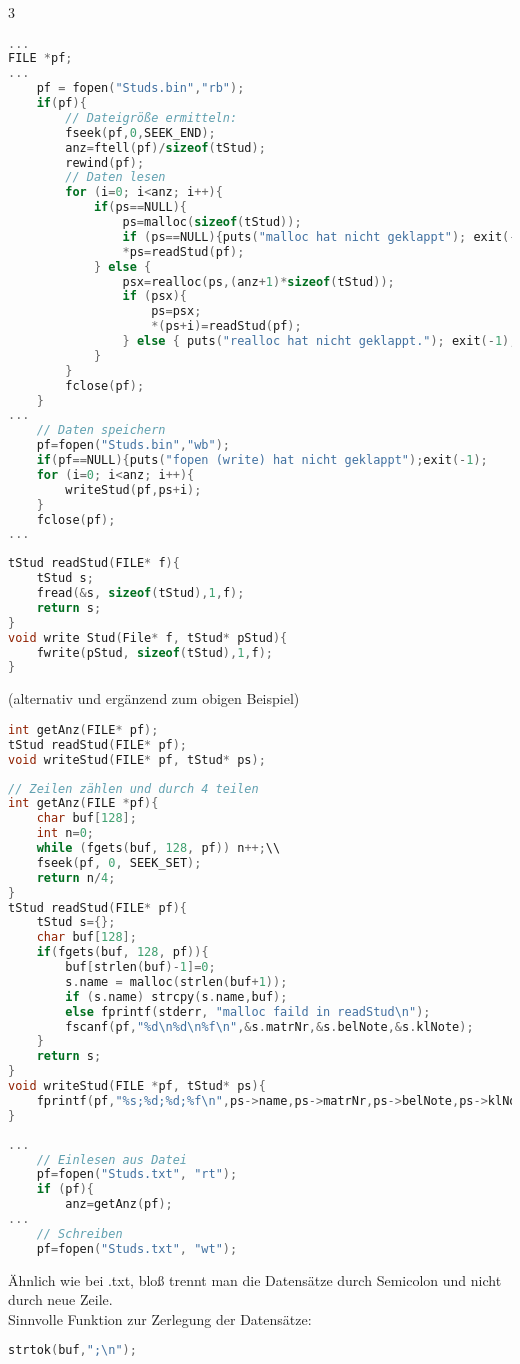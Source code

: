 \begin{multicols}{3}
\begin{lstlisting}[language=C]
...
FILE *pf;
...
	pf = fopen("Studs.bin","rb");
	if(pf){
		// Dateigröße ermitteln:
		fseek(pf,0,SEEK_END);
		anz=ftell(pf)/sizeof(tStud);
		rewind(pf);		
		// Daten lesen
		for (i=0; i<anz; i++){
			if(ps==NULL){
				ps=malloc(sizeof(tStud));
				if (ps==NULL){puts("malloc hat nicht geklappt"); exit(-1);}
				*ps=readStud(pf);
			} else {	
				psx=realloc(ps,(anz+1)*sizeof(tStud));
				if (psx){
					ps=psx;
					*(ps+i)=readStud(pf);
				} else { puts("realloc hat nicht geklappt."); exit(-1);}
			}
		}
		fclose(pf);
	}
...
	// Daten speichern
	pf=fopen("Studs.bin","wb");
	if(pf==NULL){puts("fopen (write) hat nicht geklappt");exit(-1);
	for (i=0; i<anz; i++){
		writeStud(pf,ps+i);
	}
	fclose(pf);
...
\end{lstlisting}
\begin{lstlisting}[language=C]
tStud readStud(FILE* f){
	tStud s;
	fread(&s, sizeof(tStud),1,f);
	return s;
}
void write Stud(File* f, tStud* pStud){
	fwrite(pStud, sizeof(tStud),1,f);
}
\end{lstlisting}
 (alternativ und ergänzend zum obigen Beispiel)
\begin{lstlisting}[language=C]
int getAnz(FILE* pf);
tStud readStud(FILE* pf);
void writeStud(FILE* pf, tStud* ps);
\end{lstlisting}
\begin{lstlisting}[language=C]
// Zeilen zählen und durch 4 teilen
int getAnz(FILE *pf){
	char buf[128];
	int n=0;
	while (fgets(buf, 128, pf)) n++;\\
	fseek(pf, 0, SEEK_SET);
	return n/4;
}
tStud readStud(FILE* pf){
	tStud s={};
	char buf[128];
	if(fgets(buf, 128, pf)){
		buf[strlen(buf)-1]=0;
		s.name = malloc(strlen(buf+1));
		if (s.name) strcpy(s.name,buf);
		else fprintf(stderr, "malloc faild in readStud\n");
		fscanf(pf,"%d\n%d\n%f\n",&s.matrNr,&s.belNote,&s.klNote);
	}
	return s;
}
void writeStud(FILE *pf, tStud* ps){
	fprintf(pf,"%s;%d;%d;%f\n",ps->name,ps->matrNr,ps->belNote,ps->klNote);  
}
\end{lstlisting}
\begin{lstlisting}[language=C]
...
	// Einlesen aus Datei
	pf=fopen("Studs.txt", "rt");
	if (pf){
		anz=getAnz(pf);		
...
	// Schreiben
	pf=fopen("Studs.txt", "wt");
\end{lstlisting}

Ähnlich wie bei .txt, bloß trennt man die Datensätze durch Semicolon und nicht durch neue Zeile.\\
Sinnvolle Funktion zur Zerlegung der Datensätze: 
\begin{lstlisting}[language=C]
strtok(buf,";\n");
\end{lstlisting}


\end{multicols}

